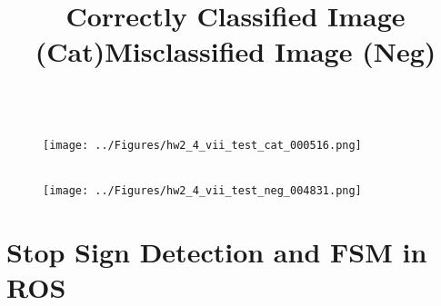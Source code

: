 \documentclass[12pt]{article}
\begin{document}
\begin{enumerate}
	\begin{figure}[H]
		\centering
		\title{\bf Correctly Classified Image (Cat)}
		\\ \vspace{2.5mm}
		\texttt{[image: ../Figures/hw2\_4\_vii\_test\_cat\_000516.png]}
	\end{figure}
	\begin{figure}[H]
		\centering
		\title{\bf Misclassified Image (Neg)}
		\\ \vspace{2.5mm}
		\texttt{[image: ../Figures/hw2\_4\_vii\_test\_neg\_004831.png]}
	\end{figure}
\end{enumerate}

\section{Stop Sign Detection and FSM in ROS}
\end{document}
